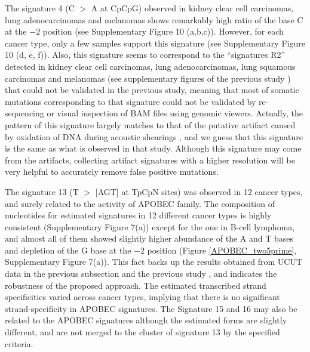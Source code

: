 The signature 4 (C $>$ A at CpCpG) observed in kidney clear cell carcinomas, lung adenocarcinomas and melanomas 
shows remarkably high ratio of the base C at the $-2$ position (see Supplementary Figure 10 (a,b,c)).
However, for each cancer type, only a few samples support this signature (see Supplementary Figure 10 (d, e, f)).
Also, this signature seems to correspond to the ``signatures R2''  detected in kidney clear cell carcinomas, lung adenocarcinomas, lung squamous carcinomas and melanomas (see supplementary figures of the previous study \cite{pmid23318258})
that could not be validated in the previous study,
meaning that most of somatic mutations corresponding to that signature could not be validated by re-sequencing or visual inspection of BAM files using genomic viewers.
Actually, the pattern of this signature largely matches to that of the putative artifact caused by oxidation of DNA during acoustic shearings \cite{pmid23303777}, 
and we guess that this signature is the same as what is observed in that study.
Although this signature may come from the artifacts, 
collecting artifact signatures with a higher resolution will be very helpful to accurately remove false positive mutations.


The signature 13 (T $>$ [AGT] at TpCpN sites) was observed in 12 cancer types, and surely related to the activity of APOBEC family.
The composition of nucleotides for estimated signatures in 12 different cancer types is highly consistent (Supplementary Figure 7(a)) except for the one in B-cell lymphoma,
and almost all of them showed slightly higher abundance of the A and T bases and depletion of the G base at the $-2$ position (Figure \ref{APOBEC_two5prime}, Supplementary Figure 7(a)).
This fact backs up the results obtained from UCUT data in the previous subsection and the previous study \cite{pmid23318258},
and indicates the robustness of the proposed approach.
The estimated transcribed strand specificities varied across cancer types, implying that there is no significant strand-specificity in APOBEC signatures.
The Signature 15 and 16 may also be related to the APOBEC signatures although the estimated forms are slightly different,
and are not merged to the cluster of signature 13 by the specified criteria.


